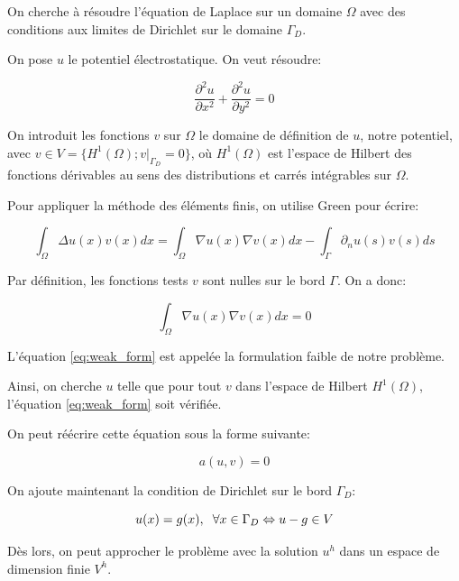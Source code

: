 \documentclass{article}
\begin{document}
\hspace{0.5cm}
On cherche à résoudre l'équation de Laplace sur un domaine $\Omega$ avec des
conditions aux limites de Dirichlet sur le domaine $\Gamma_D$.

On pose $u$ le potentiel électrostatique. On veut résoudre:

\begin{equation}
   \frac{\partial^2 u}{\partial x^2} + \frac{\partial^2 u}{\partial y^2} = 0
\end{equation}

On introduit les fonctions $v$ sur $\Omega$ le domaine de définition de $u$,
notre potentiel, avec $v \in V = \{H^1(\Omega); v|_{\Gamma_D} = 0 \}$, où
$H^1(\Omega)$ est l'espace de Hilbert des fonctions dérivables au sens des
distributions et carrés intégrables sur $\Omega$.

Pour appliquer la méthode des éléments finis, on utilise Green
pour écrire:

\begin{equation}
    \int_\Omega \Delta u(x) v(x) dx = \int_\Omega \nabla u(x) \nabla v(x) dx
    - \int_{\Gamma} \partial_n u(s) v(s) ds
\end{equation}

Par définition, les fonctions tests $v$ sont nulles sur le bord $\Gamma$. On a
donc:

\begin{equation}
    \int_\Omega \nabla u(x) \nabla v(x) dx = 0
    \label{eq:weak_form}
\end{equation}

L'équation \ref{eq:weak_form} est appelée la formulation
faible de notre problème.

Ainsi, on cherche $u$ telle que pour tout $v$ dans l'espace
de Hilbert $H^1(\Omega)$, l'équation \ref{eq:weak_form} soit vérifiée.

On peut réécrire cette équation sous la forme suivante:

\begin{equation}
    a(u, v) = 0
\end{equation}

On ajoute maintenant la condition de Dirichlet sur le bord $\Gamma_D$:

\begin{equation}
    u(x) = g(x), \hspace{0.2cm} \forall x \in \Gamma_D
    \Leftrightarrow  u-g \in V
\end{equation}

Dès lors, on peut approcher le problème avec la solution 
$u^h$ dans un espace de dimension finie $V^h$.
\end{document}
